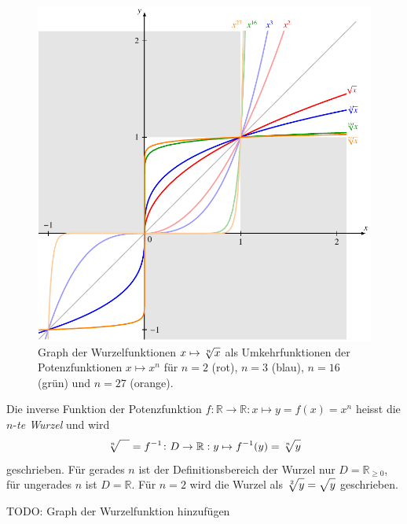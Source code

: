 \begin{figure}
\centering
\includegraphics{chapters/010-potenzen/images/wurzel.pdf}
\caption[Graph der Wurzelfunktionen]{Graph der Wurzelfunktionen
\ensuremath{x\mapsto\root{n}\of{x}}
als Umkehrfunktionen der Potenzfunktionen $x\mapsto x^n$ für
$n=2$ ({\color{red}rot}), $n=3$ ({\color{blue}blau}),
$n=16$ ({\color{darkgreen}grün}) und $n=27$ ({\color{orange}orange}).
\label{buch:potenzen:fig:wurzel}
}
\end{figure}

\begin{definition}
Die inverse Funktion der Potenzfunktion
$f\colon \mathbb{R}\to\mathbb{R}:x\mapsto y=f(x)=x^n$
heisst die $n$-{\em te Wurzel} und wird
\[
\root{n}\of{\mathstrut\phantom{m}}
=
f^{-1}
\colon
D\to\mathbb{R}
:
y\mapsto f^{-1}(y)=\root{n}\of{\mathstrut y}
\]
geschrieben.
Für gerades $n$ ist der Definitionsbereich der Wurzel nur
$D=\mathbb{R}_{\ge 0}$, für ungerades $n$ ist $D=\mathbb{R}$.
Für $n=2$ wird die Wurzel als
\(
\root{2}\of{\mathstrut y}
=
\sqrt{\mathstrut y}
\)
geschrieben.
\end{definition}

TODO: Graph der Wurzelfunktion hinzufügen

